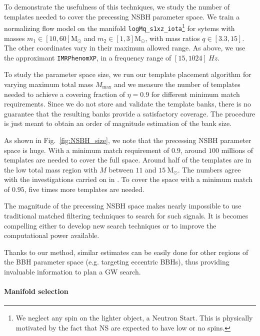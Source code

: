 \documentclass[twocolumn,showpacs,preprintnumbers,nofootinbib,prd,
superscriptaddress,10pt]{revtex4-2}
\begin{document}
To demonstrate the usefulness of this techniques, we study the number of templates needed to cover the precessing NSBH parameter space.
We train a normalizing flow model on the manifold \texttt{logMq\_s1xz\_iota}\footnote{We neglect any spin on the lighter object, a Neutron Start. This is physically motivated by the fact that NS are expected to have low or no spins.} for sytems with masses $m_1 \in [10, 60] \mathrm{M_\odot}$ and  $m_2 \in [1, 3] \mathrm{M_\odot}$, with mass ratios $q \in [3.3, 15]$. The other coordinates vary in their maximum allowed range. As above, we use the approximant \texttt{IMRPhenomXP}, in a frequency range of $[15, 1024] \SI{}{Hz}$.

To study the parameter space size, we run our template placement algorithm for varying maximum total mass $M_\text{max}$ and we measure the number of templates needed to achieve a covering fraction of $\eta = 0.9$ for different minimum match requirements.
Since we do not store and validate the template banks, there is no guarantee that the resulting banks provide a satisfactory coverage. The procedure is just meant to obtain an order of magnitude estimation of the bank size.

As shown in Fig.~\ref{fig:NSBH_size}, we note that the precessing NSBH parameter space is huge. With a minimum match requirement of $0.9$, around $100$ millions of templates are needed to cover the full space. Around half of the templates are in the low total mass region with $M$ between $11$ and $\SI{15}{ \mathrm{M_\odot}}$. The numbers agree with the investigations carried on in \cite{McIsaac:2023ijd}.
To cover the space with a minimum match of $0.95$, five times more templates are needed.

The magnitude of the precessing NSBH space makes nearly impossible to use traditional matched filtering techniques to search for such signals. It is becomes compelling either to develop new search techniques \cite{McIsaac:2023ijd} or to improve the computational power available.

Thanks to our method, similar estimates can be easily done for other regions of the BBH parameter space (e.g. targeting eccentric BBHs), thus providing invaluable information to plan a GW search.

\paragraph{Manifold selection}
\end{document}
